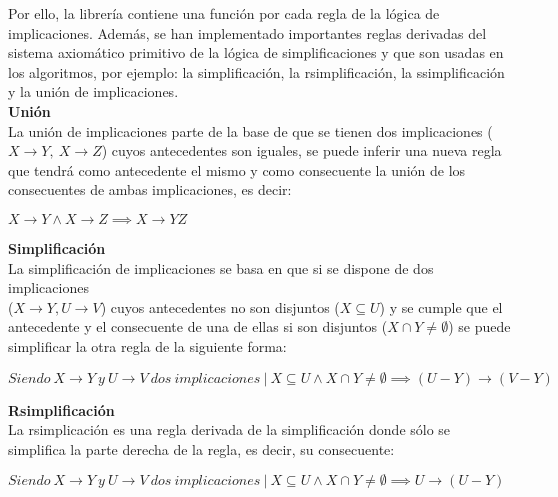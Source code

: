 Por ello, la librer\'ia contiene una funci\'on por cada regla de la l\'ogica de implicaciones. Adem\'as, se han implementado importantes reglas derivadas del sistema axiom\'atico primitivo de la l\'ogica de simplificaciones y que son usadas en los algoritmos, por ejemplo: la simplificaci\'on, la rsimplificaci\'on, la ssimplificaci\'on y la uni\'on de implicaciones.\\

\textbf{Uni\'on}\\
La uni\'on de implicaciones parte de la base de que se tienen dos implicaciones (\(X \to Y, \ X \to Z\)) cuyos antecedentes son iguales, se puede inferir una nueva regla que tendr\'a como antecedente el mismo y como consecuente la uni\'on de los consecuentes de ambas implicaciones, es decir:

\begin{center}
    \(X \to Y \wedge X \to Z \implies X \to YZ \)
\end{center}


\bigskip
\textbf{Simplificaci\'on}\\
La simplificaci\'on de implicaciones se basa en que si se dispone de dos implicaciones \\ (\(X \to Y , U \to V\)) cuyos antecedentes no son disjuntos (\(X \subseteq U\)) y se cumple que el antecedente y el consecuente de una de ellas si son disjuntos (\(X \cap Y \neq \emptyset\)) se puede simplificar la otra regla de la siguiente forma:

\begin{center}
    \(Siendo \ X \to Y \ y \ U\to V \ dos \ implicaciones \ | \ X \subseteq U \wedge X \cap Y \neq \emptyset \implies (U - Y) \to (V - Y)\)
\end{center}


\bigskip
\textbf{Rsimplificaci\'on}\\
La rsimplicaci\'on es una regla derivada de la simplificaci\'on donde s\'olo se simplifica la parte derecha de la regla, es decir, su consecuente:

\begin{center}
    \(Siendo \ X \to Y \ y \ U\to V \ dos \ implicaciones \ | \ X \subseteq U \wedge X \cap Y \neq \emptyset \implies U \to (U - Y)\)
\end{center}


\bigskip

